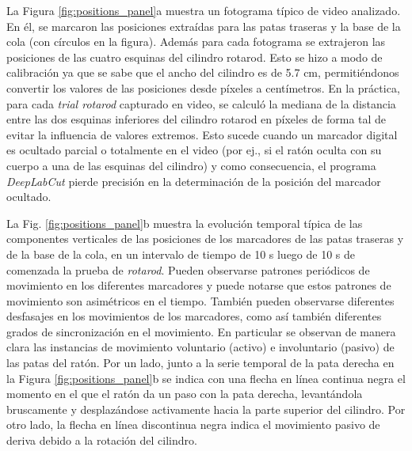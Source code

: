 La Figura \ref{fig:positions_panel}a muestra un fotograma típico de video analizado. En él, se marcaron las posiciones extraídas para las patas traseras y la base de la cola (con círculos en la figura). Además para cada fotograma se extrajeron las posiciones de las cuatro esquinas del cilindro rotarod. Esto se hizo a modo de calibración ya que se sabe que el ancho del cilindro es de 5.7 cm, permitiéndonos convertir los valores de las posiciones desde píxeles a centímetros. En la práctica, para cada \textit{trial rotarod} capturado en video, se calculó la mediana de la distancia entre las dos esquinas inferiores del cilindro rotarod en píxeles de forma tal de evitar la influencia de valores extremos. Esto sucede cuando un marcador digital es ocultado parcial o totalmente en el video (por ej., si el ratón oculta con su cuerpo a una de las esquinas del cilindro) y como consecuencia, el programa \textit{DeepLabCut} pierde precisión en la determinación de la posición del marcador ocultado. 

La Fig. \ref{fig:positions_panel}b muestra la evolución temporal típica de las componentes verticales de las posiciones de los marcadores de las patas traseras y de la base de la cola, en un intervalo de tiempo de 10 s luego de 10 s de comenzada la prueba de \textit{rotarod}. Pueden observarse patrones periódicos de movimiento en los diferentes marcadores y puede notarse que estos patrones de movimiento son asimétricos en el tiempo. También pueden observarse diferentes desfasajes en los movimientos de los marcadores, como así también diferentes grados de sincronización en el movimiento. En particular se observan de manera clara las instancias de movimiento voluntario (activo) e involuntario (pasivo) de las patas del ratón. Por un lado, junto a la serie temporal de la pata derecha en la Figura \ref{fig:positions_panel}b se indica con una flecha en línea continua negra el momento en el que el ratón da un paso con la pata derecha, levantándola bruscamente y desplazándose activamente hacia la parte superior del cilindro. Por otro lado, la flecha en línea discontinua negra indica el movimiento pasivo de deriva debido a la rotación del cilindro.


